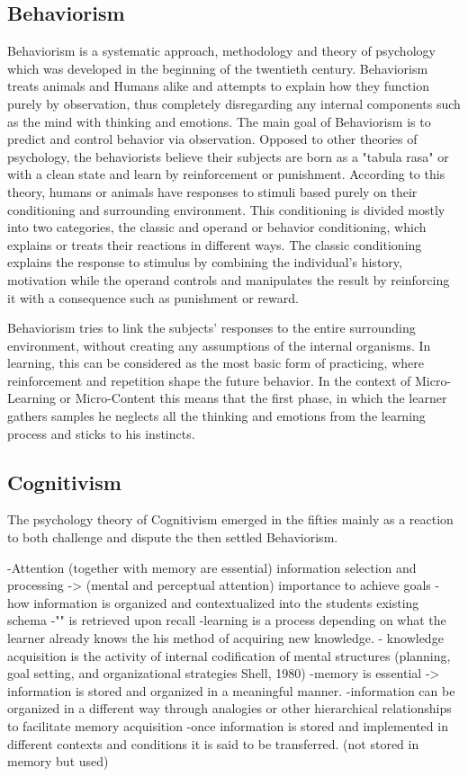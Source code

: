 \subsection{Behaviorism}

Behaviorism is a systematic approach, methodology and theory of psychology which
was developed in the beginning of the twentieth century. Behaviorism treats 
animals and Humans alike and attempts to explain how they function 
purely by observation, thus completely disregarding any internal components such 
as the mind with thinking and emotions. The main goal of Behaviorism is to predict
and control behavior via observation. Opposed to other theories of psychology, the
behaviorists believe their subjects are born as a "tabula rasa" or with a 
clean state and learn by reinforcement or punishment. According to this theory,
humans or animals have responses to stimuli based purely on their conditioning
and surrounding environment. This conditioning is divided mostly into two 
categories, the classic and operand or behavior conditioning, which explains or 
treats their reactions in different ways. The classic conditioning explains the 
response to stimulus by combining the individual's history, motivation while 
the operand controls and manipulates the result by reinforcing it with a 
consequence such as punishment or reward.

Behaviorism tries to link the subjects' responses to the entire surrounding 
environment, without creating any assumptions of the internal organisms. In 
learning, this can be considered as the most basic form of practicing, where 
reinforcement and repetition shape the future behavior. In the context of 
Micro-Learning or Micro-Content this means that the first phase, in which the 
learner gathers samples he neglects all the thinking and emotions from the learning
process and sticks to his instincts.



\subsection{Cognitivism}

The psychology theory of Cognitivism emerged in the fifties mainly as a reaction 
to both challenge and dispute the then settled Behaviorism.

-Attention (together with memory are essential) information 
selection and processing -> (mental and perceptual attention) importance to 
achieve goals
-how information is organized and contextualized into the students existing schema
-"" is retrieved upon recall
-learning is a process depending on what the learner already knows the his method
of acquiring new knowledge.
- knowledge acquisition is the activity of internal codification of mental 
structures (planning, goal setting, and organizational strategies Shell, 1980)
-memory is essential -> information is stored and organized in a meaningful manner.
-information can be organized in a different way through analogies or other 
hierarchical relationships to facilitate memory acquisition
-once information is stored and implemented in different contexts and conditions
it is said to be transferred. (not stored in memory but used)



